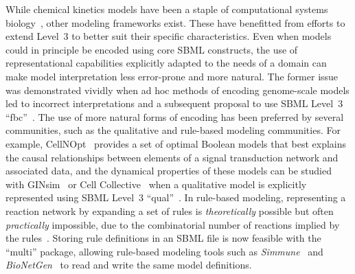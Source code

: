 \documentclass{sbml-paper}
\begin{document}
While chemical kinetics models have been a staple of computational systems biology~\citep{hubner2011applications}, other modeling frameworks exist.  These have benefitted from efforts to extend Level~3 to better suit their specific characteristics.  Even when models could in principle be encoded using core SBML constructs, the use of representational capabilities explicitly adapted to the needs of a domain can make model interpretation less error-prone and more natural.  The former issue was demonstrated vividly when ad hoc methods of encoding genome-scale models led to incorrect interpretations and a subsequent proposal to use SBML Level~3 ``fbc''~\citep{Ebrahim2015}.  The use of more natural forms of encoding has been preferred by several communities, such as the qualitative and rule-based modeling communities.  For example, CellNOpt~\citep{terfve2012cellnoptr} provides a set of optimal Boolean models that best explains the causal relationships between elements of a signal transduction network and associated data, and the dynamical properties of these models can be studied with GINsim~\citep{chaouiya2012logical} or Cell Collective~\citep{helikar2012cell} when a qualitative model is explicitly represented using SBML Level~3 ``qual''~\citep{Chaouiya2015sbml}.  In rule-based modeling, representing a reaction network by expanding a set of rules is \emph{theoretically} possible but often \emph{practically} impossible, due to the combinatorial number of reactions implied by the rules~\citep{Hlavacek2003complexity}.  Storing rule definitions in an SBML file is now feasible with the ``multi'' package, allowing rule-based modeling tools such as \emph{Simmune}~\citep{zhang2013simmune} and \emph{BioNetGen}~\citep{faeder2009rule, Harris2016bionetgen} to read and write the same model definitions.  %
\end{document}
